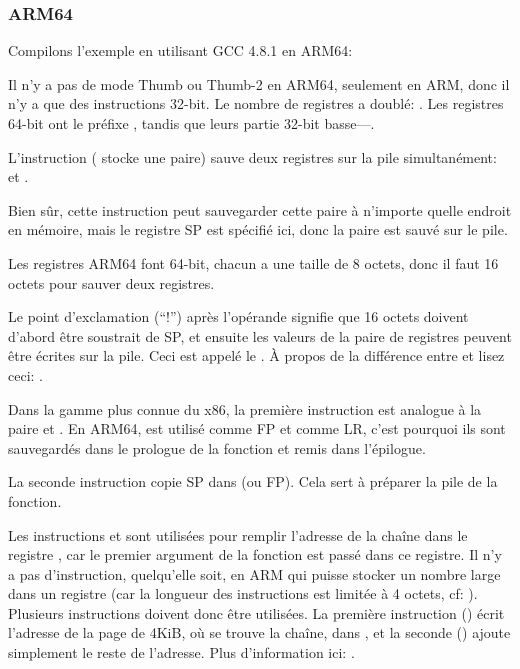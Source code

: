 ﻿\subsubsection{ARM64}


Compilons l'exemple en utilisant GCC 4.8.1 en ARM64:



Il n'y a pas de mode Thumb ou Thumb-2 en ARM64, seulement en ARM, donc il n'y a que des
instructions 32-bit.
Le nombre de registres a doublé: .
Les registres 64-bit ont le préfixe , tandis que leurs partie 32-bit basse---.

L'instruction  ( stocke une paire)
sauve deux registres sur la pile simultanément:  et .

Bien sûr, cette instruction peut sauvegarder cette paire à n'importe quelle endroit en mémoire,
mais le registre \ac{SP} est spécifié ici, donc la paire est sauvé sur le pile.

Les registres ARM64 font 64-bit, chacun a une taille de 8 octets, donc il faut 16 octets pour sauver
deux registres.

Le point d'exclamation (``!'') après l'opérande signifie que 16 octets doivent d'abord être soustrait de \ac{SP},
et ensuite les valeurs de la paire de registres peuvent être écrites sur la pile.
Ceci est appelé le .
À propos de la différence entre  et 
lisez ceci: .

Dans la gamme plus connue du x86, la première instruction est analogue à la paire
 et .
En ARM64,  est utilisé comme \ac{FP} et  comme \ac{LR}, c'est pourquoi ils sont
sauvegardés dans le prologue de la fonction et remis dans l'épilogue.

La seconde instruction copie \ac{SP} dans  (ou \ac{FP}).
Cela sert à préparer la pile de la fonction.

\label{pointers_ADRP_and_ADD}
Les instructions  et \ADD sont utilisées pour remplir l'adresse de
la chaîne  dans le registre ,
car le premier argument de la fonction est passé dans ce registre.
Il n'y a pas d'instruction, quelqu'elle soit, en ARM qui puisse stocker un nombre large
dans un registre (car la longueur des instructions est limitée à 4 octets, cf: ).
Plusieurs instructions doivent donc être utilisées. La première instruction () écrit l'adresse de
la page de 4KiB, où se trouve la chaîne, dans , et la seconde (\ADD) ajoute simplement
le reste de l'adresse.
Plus d'information ici: .

